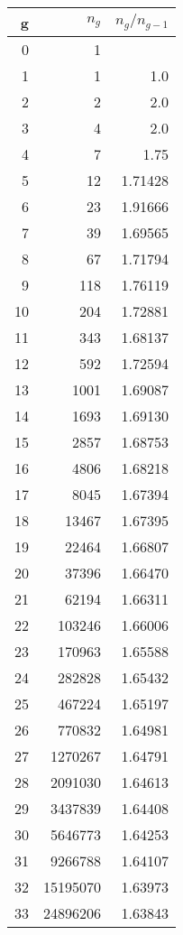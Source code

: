 \documentclass[reqno,11pt]{amsart}
\theoremstyle{plain}
\theoremstyle{definition}
\begin{document}
\begin{minipage}{0.5\textwidth}
\begin{tabular}{|r|r|r|}
\hline
g & $n_g$ & $n_g/n_{g-1}$\\
\hline
0 & 1 &  \\
1 & 1 & 1.0 \\
2 & 2 & 2.0 \\
3 & 4 & 2.0 \\
4 & 7 & 1.75 \\
5 & 12 & 1.71428 \\
6 & 23 & 1.91666 \\
7 & 39 & 1.69565 \\
8 & 67 & 1.71794 \\
9 & 118 & 1.76119 \\
10 & 204 & 1.72881 \\
11 & 343 & 1.68137 \\
12 & 592 & 1.72594 \\
13 & 1001 & 1.69087 \\
14 & 1693 & 1.69130 \\
15 & 2857 & 1.68753 \\
16 & 4806 & 1.68218 \\
17 & 8045 & 1.67394 \\
18 & 13467 & 1.67395 \\
19 & 22464 & 1.66807 \\
20 & 37396 & 1.66470 \\
21 & 62194 & 1.66311 \\
22 & 103246 & 1.66006 \\
23 & 170963 & 1.65588 \\
24 & 282828 & 1.65432 \\
25 & 467224 & 1.65197 \\
26 & 770832 & 1.64981 \\
27 & 1270267 & 1.64791 \\
28 & 2091030 & 1.64613 \\
29 & 3437839 & 1.64408 \\
30 & 5646773 & 1.64253 \\
31 & 9266788 & 1.64107 \\
32 & 15195070 & 1.63973 \\
33 & 24896206 & 1.63843 \\

\hline
\end{tabular}
\end{minipage}
\end{document}

